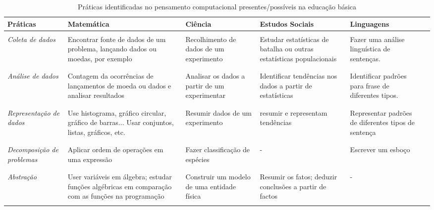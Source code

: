 
\begin{table}[htb]
  \label{tab:barr-1}
  \caption{Práticas identificadas no pensamento computacional presentes/possíveis na educação básica}

  \begin{center}
    \begin{tabularx}{\textwidth}{@{}YYYYYY@{}}
      \hline 
      \textbf{Práticas} & \textbf{Matemática} & \textbf{Ciência} & \textbf{Estudos Sociais} & \textbf{Linguagens} \\

      \hline
      \\
      \textit{Coleta de   dados} & Encontrar fonte de dados de um problema, lançando dados ou moedas, por exemplo & Recolhimento de dados de um
      experimento & Estudar estatísticas de batalha ou outras estatísticas populacionais & Fazer uma análise linguística
      de sentenças. \\ \\

      \hline
      \\
      \textit{Análise de dados} & Contagem da ocorrências de lançamentos de moeda ou dados e analisar resultados & Analisar os dados a partir de um experimentar & Identificar tendências nos dados a partir de estatísticas & Identificar padrões para frase de diferentes tipos. \\ \\
      
      \hline
      \\
      \textit{ Representação de dados} & Use histograma, gráfico circular, gráfico de barras... Usar conjuntos, listas, gráficos, etc. & Resumir dados de um experimento & resumir e representam tendências & Representar padrões de diferentes tipos de sentença \\ \\

      \hline
      \\
      \textit{Decomposição de problemas} & Aplicar ordem de operações em uma
      expressão & Fazer classificação de espécies & - & Escrever um esboço \\ \\ 

      \hline
      \\
      \textit{Abstração} & User variáveis em álgebra; estudar funções algébricas em comparação com as funções na programação & Construir um modelo de uma entidade física & Resumir os fatos; deduzir conclusões a partir de factos & - \\ \\%
      \hline
    \end{tabularx}
  \end{center}
\end{table}

